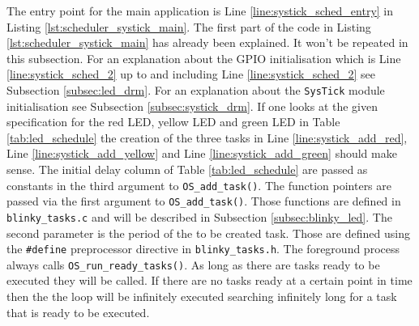 \newpage

The entry point for the main application is Line \ref{line:systick_sched_entry} in Listing \ref{lst:scheduler_systick_main}.
The first part of the code in Listing \ref{lst:scheduler_systick_main} has already been explained. It won't be repeated in this subsection.
For an explanation about the GPIO initialisation which is Line \ref{line:systick_sched_2} up to and including Line \ref{line:systick_sched_2} see Subsection \ref{subsec:led_drm}.
For an explanation about the \texttt{SysTick} module initialisation see Subsection \ref{subsec:systick_drm}.
If one looks at the given specification for the red LED, yellow LED and green LED in Table \ref{tab:led_schedule} the creation of the three tasks in Line \ref{line:systick_add_red}, Line \ref{line:systick_add_yellow} and Line \ref{line:systick_add_green} should make sense.
The initial delay column of Table \ref{tab:led_schedule} are passed as constants in the third argument to \texttt{OS\_add\_task()}.
The function pointers are passed via the first argument to \texttt{OS\_add\_task()}. Those functions are defined in \texttt{blinky\_tasks.c} and will be described in Subsection \ref{subsec:blinky_led}.
The second parameter is the period of the to be created task.
Those are defined using the \texttt{\#define} preprocessor directive in \texttt{blinky\_tasks.h}.
The foreground process always calls \texttt{OS\_run\_ready\_tasks()}. As long as there are tasks ready to be executed they will be called.
If there are no tasks ready at a certain point in time then the the loop will be infinitely executed searching infinitely long for a task that is ready to be executed.

